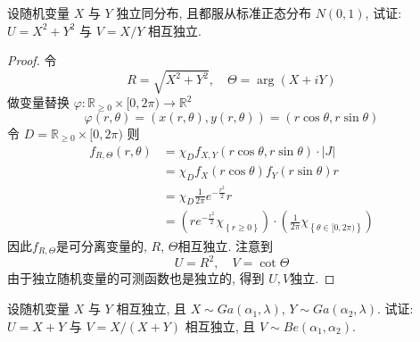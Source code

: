 \documentclass[../main.tex]{subfiles}
\begin{document}
\begin{exercise}{}{}
设随机变量 $X$ 与 $Y$ 独立同分布, 且都服从标准正态分布 $N(0,1)$, 试证: $U = X^2 + Y^2$ 与 $V = X/Y$ 相互独立.
\end{exercise}
\begin{proof}
  令 \[
  R =  \sqrt{X^{2}+ Y^{2}},\quad \Theta = \operatorname{arg}\left( X+ iY \right) 
  \]做变量替换  \(   \varphi :\mathbb{R} _{\ge 0}\times [0,2 \pi ) \to  \mathbb{R} ^{2} \) \[
   \varphi \left( r, \theta  \right)= \left( x\left( r, \theta  \right),y\left( r, \theta  \right)   \right)= \left( r\cos  \theta , r\sin  \theta  \right)   
  \]令 \(  D=  \mathbb{R} _{\ge 0}\times [0,2 \pi )  \)  则 \[
 \begin{aligned}
  f_{R,\Theta }\left( r, \theta  \right)&=\chi _{D} f_{X,Y}\left( r\cos  \theta , r\sin  \theta  \right)\cdot \left| J \right|\\ 
   &= \chi _{D}f_{X}\left( r\cos  \theta  \right) f_{Y}\left( r\sin  \theta  \right)r\\ 
    &= \chi _{D}     \frac{1 }{2 \pi  }e^{-\frac{r^{2} }{2 } }r \\ 
     &= \left( re^{-\frac{r^{2} }{2 } }\chi _{\left\{ r\ge 0 \right\}} \right)\cdot \left( \frac{1 }{2 \pi  }\chi _{\left\{  \theta \in [0,2 \pi ) \right\}}  \right)  
 \end{aligned} 
  \]因此\(  f_{R,\Theta }  \)是可分离变量的,  \(  R  \), \(  \Theta   \)相互独立.   注意到 \[
  U= R^{2},\quad V= \cot \Theta  
  \]由于独立随机变量的可测函数也是独立的, 得到 \(  U,V  \)独立. 
\end{proof}

\begin{exercise}{}{}
设随机变量 $X$ 与 $Y$ 相互独立, 且 $X \sim Ga(\alpha_1,\lambda)$, $Y \sim Ga(\alpha_2,\lambda)$. 试证: $U = X + Y$ 与 $V = X/(X+Y)$ 相互独立, 且 $V \sim Be(\alpha_1,\alpha_2)$.
\end{exercise}
\end{document}
